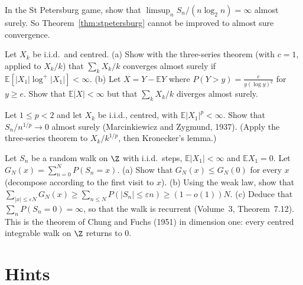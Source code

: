 \begin{exercise}[$\star\star$]\label{ex:stpeteas}
In the St Petersburg game, show that $\limsup_nS_n/(n\log_2n)=\infty$ almost surely. So Theorem~\ref{thm:stpetersburg} cannot be improved to almost sure
convergence.
\end{exercise}

\begin{exercise}[$\star\star$]\label{ex:seriesiid}
Let $X_k$ be i.i.d.\ and centred. (a) Show with the three-series theorem (with $c=1$, applied to $X_k/k$) that $\sum_kX_k/k$ converges almost surely
if $\mathbb E[|X_1|\log^+|X_1|]<\infty$. (b) Let $X=Y-\mathbb E Y$ where $P(Y>y)=\frac e{y(\log y)^2}$ for $y\ge e$. Show that $\mathbb E|X|<\infty$ but that
$\sum_kX_k/k$ diverges almost surely.
\end{exercise}

\begin{exercise}[$\star\star\star$]\label{ex:mz}
Let $1\le p<2$ and let $X_k$ be i.i.d., centred, with $\mathbb E|X_1|^p<\infty$. Show that $S_n/n^{1/p}\to0$ almost surely (Marcinkiewicz and
Zygmund, 1937). (Apply the three-series theorem to $X_k/k^{1/p}$, then Kronecker's lemma.)
\end{exercise}

\begin{exercise}[$\star\star\star$]\label{ex:chungfuchs}
Let $S_n$ be a random walk on $\Z$ with i.i.d.\ steps, $\mathbb E|X_1|<\infty$ and $\mathbb E X_1=0$. Let $G_N(x)=\sum_{n=0}^NP(S_n=x)$. (a) Show that
$G_N(x)\le G_N(0)$ for every $x$ (decompose according to the first visit to $x$). (b) Using the weak law, show that
$\sum_{|x|\le\varepsilon N}G_N(x)\ge\sum_{n\le N}P(|S_n|\le\varepsilon n)\ge(1-o(1))N$. (c) Deduce that $\sum_nP(S_n=0)=\infty$, so that the walk is recurrent
(Volume~3, Theorem~7.12). This is the theorem of Chung and Fuchs (1951) in dimension one: every centred integrable walk on $\Z$ returns to $0$.
\end{exercise}

\section{Hints}

